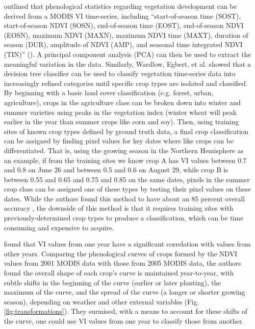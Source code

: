\citeauthor{gu2010phenological} outlined that phenological statistics regarding vegetation development can be derived from a MODIS VI time-series, including “start-of-season time (SOST), start-of-season NDVI (SOSN), end-of-season time (EOST), end-of-season NDVI (EOSN), maximum NDVI (MAXN), maximum NDVI time (MAXT), duration of season (DUR), amplitude of NDVI (AMP), and seasonal time integrated NDVI (TIN)” \mkbibparens{\citeyear[529]{gu2010phenological}}. A principal component analysis (PCA) can then be used to extract the meaningful variation in the data. Similarly, Wardlow, Egbert, et al. \autocites{wardlow2002discriminating}{wardlow2005state-level}{wardlow2007analysis}{wardlow2008large-area} showed that a decision tree classifier can be used to classify vegetation time-series data into increasingly refined categories until specific crop types are isolated and classified. By beginning with a basic land cover classification (e.g. forest, urban, agriculture), crops in the agriculture class can be broken down into winter and summer varieties using peaks in the vegetation index (winter wheat will peak earlier in the year than summer crops like corn and soy). Then, using training sites of known crop types defined by ground truth data, a final crop classification can be assigned by finding pixel values for key dates where like crops can be differentiated. That is, using the growing season in the Northern Hemisphere as an example, if from the training sites we know crop A has VI values between 0.7 and 0.8 on June 26 and between 0.5 and 0.6 on August 29, while crop B is between 0.55 and 0.65 and 0.75 and 0.85 on the same dates, pixels in the summer crop class can be assigned one of these types by testing their pixel values on these dates. While the authors found this method to have about an 85 percent overall accuracy \autocite{wardlow2005state-level}, the downside of this method is that it requires training sites with previously-determined crop types to produce a classification, which can be time consuming and expensive to acquire.

\textcite{masialeti2010a-comparative} found that VI values from one year have a significant correlation with values from other years. Comparing the phenological curves of crops formed by the NDVI values from 2001 MODIS data \autocite[from][]{wardlow2005state-level} with those from 2005 MODIS data, the authors found the overall shape of each crop's curve is maintained year-to-year, with subtle shifts in the beginning of the curve (earlier or later planting), the maximum of the curve, and the spread of the curve (a longer or shorter growing season), depending on weather and other external variables (Fig. \ref{fig:transformations}). They surmised, with a means to account for these shifts of the curve, one could use VI values from one year to classify those from another.

